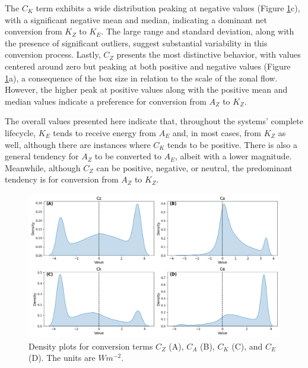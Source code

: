 The $C_K$ term exhibits a wide distribution peaking at negative values (Figure \ref{fig:ridge_plot_Conversion_Terms_total}c), with a significant negative mean and median, indicating a dominant net conversion from $K_Z$ to $K_E$. The large range and standard deviation, along with the presence of significant outliers, suggest substantial variability in this conversion process. Lastly, $C_Z$ presents the most distinctive behavior, with values centered around zero but peaking at both positive and negative values (Figure \ref{fig:ridge_plot_Conversion_Terms_total}a), a consequence of the box size in relation to the scale of the zonal flow. However, the higher peak at positive values along with the positive mean and median values indicate a preference for conversion from $A_Z$ to $K_Z$. 

The overall values presented here indicate that, throughout the systems' complete lifecycle, $K_E$ tends to receive energy from $A_E$ and, in most cases, from $K_Z$ as well, although there are instances where $C_K$ tends to be positive. There is also a general tendency for $A_Z$ to be converted to $A_E$, albeit with a lower magnitude. Meanwhile, although $C_Z$ can be positive, negative, or neutral, the predominant tendency is for conversion from $A_Z$ to $K_Z$.

\begin{figure}[!htbp]
\centering
\includegraphics[width=\textwidth]{figs_5/ridge_plot_Conversion_Terms_total.png}
\caption[Density Plots - Conversion Terms]{Density plots for conversion terms $C_Z$ (A), $C_A$ (B), $C_K$ (C), and $C_E$ (D). The units are $W m^{-2}$.}
\label{fig:ridge_plot_Conversion_Terms_total}
\end{figure}

